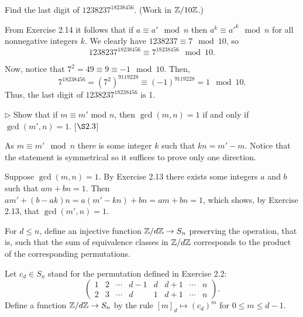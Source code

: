 \begin{exercise}
	Find the last digit of $1238237^{18238456}$. (Work in $\mathbb{Z}/10\mathbb{Z}$.)
\end{exercise}
\begin{solution}
	From Exercise 2.14 it follows that if $a\equiv a' \mod n$ then $a^k \equiv a'^k \mod n$ for all nonnegative integers $k$. We clearly have $1238237 \equiv 7 \mod 10$, so 
	\[1238237^{18238456} \equiv 7^{18238456} \mod 10.\]
	
	Now, notice that $7^2 = 49 \equiv 9 \equiv -1 \mod 10$. Then,
	\[
		7^{18238456} = (7^2)^{9119228} \equiv (-1)^9119228 = 1 \mod 10.
	\]
	Thus, the last digit of $1238237^{18238456}$ is 1.
\end{solution}

\begin{exercise}
	$\triangleright$ Show that if $m\equiv m'$ mod $n$, then $\gcd(m,n) = 1$ if and only if $\gcd(m',n) = 1$. [$\S 2.3$]
\end{exercise}
\begin{solution}
	As $m \equiv m' \mod n$ there is some integer $k$ such that $kn = m' - m$. Notice that the statement is symmetrical so it suffices to prove only one direction.
	
	Suppose $\gcd(m,n) = 1$. By Exercise 2.13 there exists some integers $a$ and $b$ such that $am + bn = 1$. Then $am' + (b-ak)n = a(m' - kn) + bn = am + bn = 1$, which shows, by Exercise 2.13, that $\gcd(m',n) = 1$.	
\end{solution}

\begin{exercise}
	For $d\leq n$, define an injective function $\mathbb{Z}/d\mathbb{Z} \to S_n$ preserving the operation, that is, such that the sum of equivalence classes in $\mathbb{Z}/d\mathbb{Z}$ corresponds to the product of the corresponding permutations.
\end{exercise}
\begin{solution}
	Let $c_d \in S_n$ stand for the permutation defined in Exercise 2.2:
	\[ 
	\begin{pmatrix}
		1 & 2 & \cdots & d - 1 & d & d+1 & \cdots & n\\
		2 & 3 & \cdots & d & 1 & d + 1 & \cdots & n
	\end{pmatrix}.
	\]
	Define a function $\mathbb{Z}/d\mathbb{Z} \to S_n$ by the rule $[m]_d \mapsto (c_d)^m$ for $0\leq m \leq d-1$.
\end{solution}

